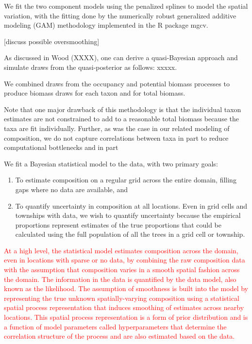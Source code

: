 \documentclass[12pt]{article}\usepackage[]{graphicx}\usepackage[]{color}
\begin{document}
We fit the two component models using the penalized splines to model
the spatial variation, with the fitting done by the numerically robust
generalized additive modeling (GAM) methodology implemented in the
R package mgcv. 

{[}discuss possible oversmoothing{]}

As discussed in Wood (XXXX), one can derive a quasi-Bayesian approach
and simulate draws from the quasi-posterior as follows: xxxxx. 

We combined draws from the occupancy and potential biomass processes
to produce biomass draws for each taxon and for total biomass. 

Note that one major drawback of this methodology is that the individual
taxon estimates are not constrained to add to a reasonable total biomass
because the taxa are fit individually. Further, as was the case in
our related modeling of composition, we do not capture correlations
between taxa in part to reduce computational bottlenecks and in part 

We fit a Bayesian statistical model to the data, with two primary
goals:
\begin{enumerate}
\item To estimate composition on a regular grid across the entire domain,
filling gaps where no data are available, and
\item To quantify uncertainty in composition at all locations. Even in grid
cells and townships with data, we wish to quantify uncertainty because
the empirical proportions represent estimates of the true proportions
that could be calculated using the full population of all the trees
in a grid cell or township.
\end{enumerate}
\textcolor{red}{At a high level, the statistical model estimates composition
across the domain, even in locations with sparse or no data, by combining
the raw composition data with the assumption that composition varies
in a smooth spatial fashion across the domain. The information in
the data is quantified by the data model, also known as the likelihood.
The assumption of smoothness is built into the model by representing
the true unknown spatially-varying composition using a statistical
spatial process representation that induces smoothing of estimates
across nearby locations. This spatial process representation is a
form of prior distribution and is a function of model parameters called
hyperparameters that determine the correlation structure of the process
and are also estimated based on the data. }
\end{document}
